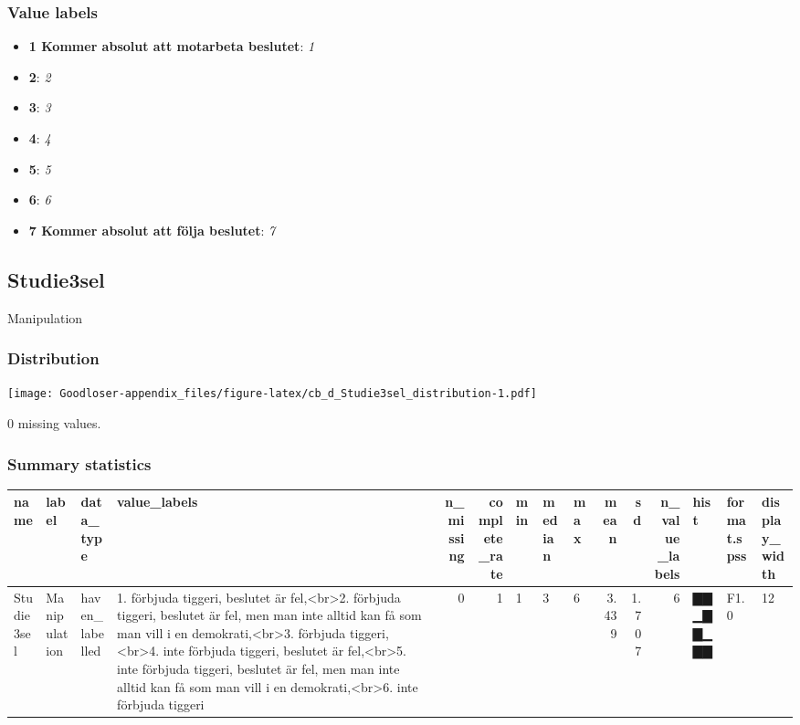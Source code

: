 \documentclass[
]{book}
\providecommand{\tightlist}{%
  \setlength{\itemsep}{0pt}\setlength{\parskip}{0pt}}
\begin{document}
\hypertarget{S3_8_1_2_labels}{%
\subsubsection{Value labels}\label{S3_8_1_2_labels}}

\begin{itemize}
\tightlist
\item
  \textbf{1 Kommer absolut att motarbeta beslutet}: \emph{1}
\item
  \textbf{2}: \emph{2}
\item
  \textbf{3}: \emph{3}
\item
  \textbf{4}: \emph{4}
\item
  \textbf{5}: \emph{5}
\item
  \textbf{6}: \emph{6}
\item
  \textbf{7 Kommer absolut att följa beslutet}: \emph{7}
\end{itemize}

\hypertarget{Studie3sel}{%
\subsection{Studie3sel}\label{Studie3sel}}

Manipulation

\hypertarget{Studie3sel_distribution}{%
\subsubsection{Distribution}\label{Studie3sel_distribution}}

\texttt{[image: Goodloser-appendix\_files/figure-latex/cb\_d\_Studie3sel\_distribution-1.pdf]}

0 missing values.

\hypertarget{Studie3sel_summary}{%
\subsubsection{Summary statistics}\label{Studie3sel_summary}}

\begin{tabular}{l|l|l|l|r|r|l|l|l|r|r|r|l|l|l}
\hline
name & label & data_type & value_labels & n_missing & complete_rate & min & median & max & mean & sd & n_value_labels & hist & format.spss & display_width\\
\hline
Studie3sel & Manipulation & haven_labelled & 1. förbjuda tiggeri, beslutet är fel,<br>2. förbjuda tiggeri, beslutet är fel, men man inte alltid kan få som man vill i en demokrati,<br>3. förbjuda tiggeri,<br>4. inte förbjuda tiggeri, beslutet är fel,<br>5. inte förbjuda tiggeri, beslutet är fel, men man inte alltid kan få som man vill i en demokrati,<br>6. inte förbjuda tiggeri & 0 & 1 & 1 & 3 & 6 & 3.439 & 1.707 & 6 & ▇▇▁▇▇▁▇▇ & F1.0 & 12\\
\hline
\end{tabular}
\end{document}
